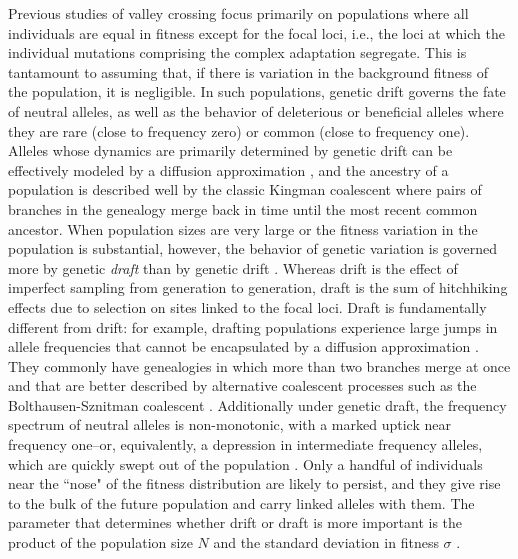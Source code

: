 \documentclass[10pt,twocolumn,twoside]{gsajnl}
\begin{document}
\begin{spacing}{1.5}
Previous studies of valley crossing focus primarily on populations where all individuals are equal in fitness except for the focal loci, i.e., the loci at which the individual mutations comprising the complex adaptation segregate.
This is tantamount to assuming that, if there is variation in the background fitness of the population, it is negligible.
In such populations, genetic drift governs the fate of neutral alleles, as well as the behavior of deleterious or beneficial alleles where they are rare (close to frequency zero) or common (close to frequency one).
Alleles whose dynamics are primarily determined by genetic drift can be effectively modeled by a diffusion approximation \citep{Wright:1945,Kimura:1955,Kimura:1957}, and the ancestry of a population is described well by the classic Kingman coalescent \citep{Kingman:1982} where pairs of branches in the genealogy merge back in time until the most recent common ancestor.
When population sizes are very large or the fitness variation in the population is substantial, however, the behavior of genetic variation is governed more by genetic \emph{draft} than by genetic drift \citep{gillespie_2000, gillespie_2001, masel_2011, neher_shraiman_2011}.
Whereas drift is the effect of imperfect sampling from generation to generation, draft is the sum of hitchhiking effects due to selection on sites linked to the focal loci.
Draft is fundamentally different from drift: for example, drafting populations experience large jumps in allele frequencies that cannot be encapsulated by a diffusion approximation \citep{neher_shraiman_2011}.
They commonly have genealogies in which more than two branches merge at once and that are better described by alternative coalescent processes such as the Bolthausen-Sznitman coalescent \citep{neher_hallatschek_2013, brunet_2007, schweinsberg_2017}.
Additionally under genetic draft, the frequency spectrum of neutral alleles is non-monotonic, with a marked uptick near frequency one--or, equivalently, a depression in intermediate frequency alleles, which are quickly swept out of the population \citep{neher_shraiman_2011,kosheleva_2013,neher_hallatschek_2013}.
Only a handful of individuals near the ``nose" of the fitness distribution are likely to persist, and they give rise to the bulk of the future population and carry linked alleles with them.
The parameter that determines whether drift or draft is more important is the product of the population size $N$ and the standard deviation in fitness $\sigma$ \citep{neher_hallatschek_2013}.


\end{spacing}
\end{document}
